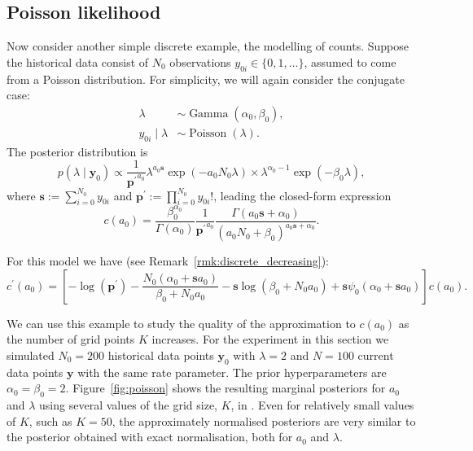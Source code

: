 \documentclass[a4paper, notitlepage, 11pt]{article}
\begin{document}
\subsection{Poisson likelihood}
\label{sec:poisson_illustration}

Now consider another simple discrete example, the modelling of counts.
Suppose the historical data consist of $N_0$ observations $y_{0i} \in \{0, 1, \ldots \}$, assumed to come from a Poisson distribution.
For simplicity, we will again consider the conjugate case:
\begin{align*}
 \lambda &\sim \operatorname{Gamma}(\alpha_0, \beta_0),\\
 y_{0i} \mid \lambda &\sim \operatorname{Poisson}(\lambda).
\end{align*}
The posterior distribution is 
\begin{equation}
 p(\lambda \mid \boldsymbol y_0) \propto \frac{1}{\boldsymbol {p^\prime}^{a_0} } \lambda^{a_0\boldsymbol s} \exp(-a_0 N_0 \lambda) \times \lambda^{\alpha_0-1} \exp(-\beta_0\lambda),
\end{equation}
where $\boldsymbol s := \sum_{i=0}^{N_0} y_{0i}$ and $\boldsymbol p^\prime := \prod_{i = 0}^{N_0} y_{0i}!$, leading the closed-form expression
\begin{equation}
 \label{eq:cA0_poisson}
 c(a_0) = \frac{\beta_0^{\alpha_0}}{\Gamma(\alpha_0)}\frac{1}{\boldsymbol {p^\prime}^{a_0} } \frac{\Gamma(a_0\boldsymbol s + \alpha_0)}{\left( a_0N_0 + \beta_0 \right)^{a_0\boldsymbol s + \alpha_0} }.
\end{equation}

For this model we have (see Remark~\ref{rmk:discrete_decreasing}):
\begin{equation}
 \label{eq:cA0_prime_poisson}
 c^\prime(a_0) = \left[ -\log(\boldsymbol p^\prime) - \frac{N_0 (\alpha_0 + \boldsymbol s a_0) }{\beta_0 + N_0a_0} - \boldsymbol s \log(\beta_0 + N_0a_0) + \boldsymbol s \psi_0(\alpha_0 + \boldsymbol s a_0) \right] c(a_0).
\end{equation}

We can use this example to study the quality of the approximation to $c(a_0)$ as the number of grid points $K$ increases.
For the experiment in this section we simulated $N_0 = 200$ historical data points $\boldsymbol y_0$ with $\lambda = 2$ and $N = 100$ current data points $\boldsymbol y$ with the same rate parameter.
The prior hyperparameters are $\alpha_0 = \beta_0 = 2$.
Figure~\ref{fig:poisson} shows the resulting marginal posteriors for $a_0$ and $\lambda$ using several values of the grid size, $K$, in .
Even for relatively small values of $K$, such as $K = 50$, the approximately normalised posteriors are very similar to the posterior obtained with exact normalisation, both for $a_0$ and $\lambda$.
\end{document}
